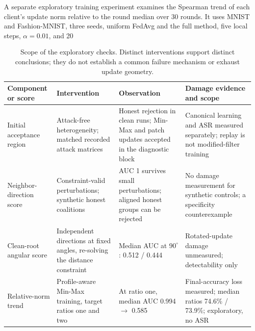 \documentclass[journal]{IEEEtran}
\begin{document}
A separate exploratory training experiment examines the Spearman trend of each client's update norm relative to the round median over 30 rounds. It uses MNIST and Fashion-MNIST, three seeds, uniform FedAvg and the full method, five local steps, $\alpha=0.01$, and 20%

\begin{table}[t]
\centering
\caption{Scope of the exploratory checks. Distinct interventions support distinct conclusions; they do not establish a common failure mechanism or exhaust update geometry.}
\label{tab:signal_scope}
\footnotesize
\begin{tabular}{p{}p{}p{}p{}}
\toprule
Component or score & Intervention & Observation & Damage evidence and scope \\
\midrule
Initial acceptance region & Attack-free heterogeneity; matched recorded attack matrices & Honest rejection in clean runs; Min-Max and patch updates accepted in the diagnostic block & Canonical learning and ASR measured separately; replay is not modified-filter training \\
Neighbor-direction score & Constraint-valid perturbations; synthetic honest coalitions & AUC 1 survives small perturbations; aligned honest groups can be rejected & No damage measurement for synthetic controls; a specificity counterexample \\
Clean-root angular score & Independent directions at fixed angles, re-solving the distance constraint & Median AUC at $90^\circ$: 0.512 / 0.444 & Rotated-update damage unmeasured; detectability only \\
Relative-norm trend & Profile-aware Min-Max training, target ratios one and two & At ratio one, median AUC 0.994 $\to$ 0.585 & Final-accuracy loss measured; median ratios 74.6\% / 73.9\%; exploratory, no ASR \\
\bottomrule
\end{tabular}
\end{table}
\end{document}
